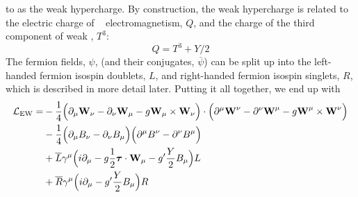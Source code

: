 to as the weak hypercharge.
By construction, the weak hypercharge is related to
the electric charge of \uone~
electromagnetism, $Q$, 
and the charge of the third component of weak \sutwo, $T^3$:
\begin{equation}
Q=T^3+Y/2
\label{eq:ewcharges}
\end{equation}
The fermion fields, $\psi$, (and their conjugates, $\overline{\psi}$)
can be split up into the 
left-handed fermion isospin doublets, $L$,  and right-handed
fermion isospin singlets, $R$, which is described in more detail later.
Putting it all together, we end up with
\begin{equation}
\begin{aligned}
\mathcal{L}_{\textrm{EW}} = 
& -\frac{1}{4}\Big(\partial_{\mu}\textbf{W}_{\nu} - \partial_{\nu}\textbf{W}_{\mu} - g \textbf{W}_{\mu}\times \textbf{W}_{\nu}\Big) \cdot \Big(\partial^{\mu}\textbf{W}^{\nu} - \partial^{\nu}\textbf{W}^{\mu} - g \textbf{W}^{\mu}\times \textbf{W}^{\nu}\Big)  \\
& -\frac{1}{4}\Big(\partial_{\mu} B_{\nu} - \partial_{\nu} B_{\mu}\Big) 
\Big(\partial^{\mu} B^{\nu} - \partial^{\nu} B^{\mu}\Big)\\
&+\overline{L}\gamma^{\mu}\Big( i \partial_{\mu} - g \frac{1}{2} \boldsymbol{\tau} \cdot \textbf{W}_{\mu} - g' \frac{Y}{2} B_{\mu} \Big) L \\
&+ \overline{R} \gamma^{\mu} \Big( i \partial_{\mu} - g' \frac{Y}{2} B_{\mu} \Big) R
\end{aligned}
\label{eq:lagrangian_ew_expanded}
\end{equation}



